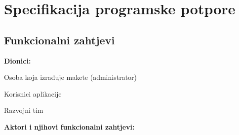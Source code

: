 \chapter{Specifikacija programske potpore}
		
	\section{Funkcionalni zahtjevi}
			
			
			\noindent \textbf{Dionici:}
			
			\begin{packed_enum}
				
				\item Osoba koja izrađuje makete (administrator)
				\item Korisnici aplikacije		
				\item Razvojni tim
				
			\end{packed_enum}
			
			\noindent \textbf{Aktori i njihovi funkcionalni zahtjevi:}
			
